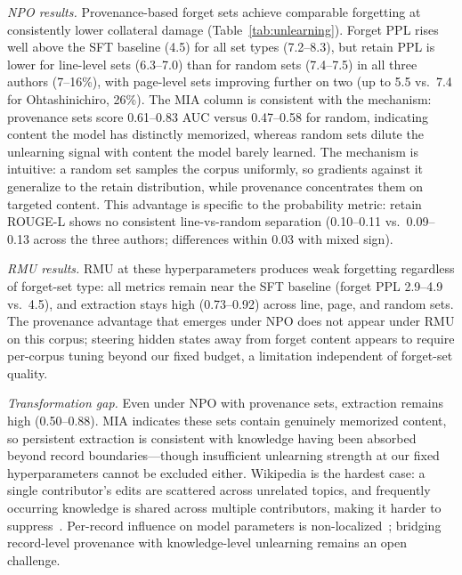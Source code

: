 \emph{NPO results.} Provenance-based forget sets achieve comparable forgetting at consistently lower collateral damage (Table~\ref{tab:unlearning}). Forget PPL rises well above the SFT baseline (4.5) for all set types (7.2--8.3), but retain PPL is lower for line-level sets (6.3--7.0) than for random sets (7.4--7.5) in all three authors (7--16\%), with page-level sets improving further on two (up to 5.5 vs.\ 7.4 for Ohtashinichiro, 26\%). The MIA column is consistent with the mechanism: provenance sets score 0.61--0.83 AUC versus 0.47--0.58 for random, indicating content the model has distinctly memorized, whereas random sets dilute the unlearning signal with content the model barely learned. The mechanism is intuitive: a random set samples the corpus uniformly, so gradients against it generalize to the retain distribution, while provenance concentrates them on targeted content. This advantage is specific to the probability metric: retain ROUGE-L shows no consistent line-vs-random separation (0.10--0.11 vs.\ 0.09--0.13 across the three authors; differences within 0.03 with mixed sign).

\emph{RMU results.} RMU at these hyperparameters produces weak forgetting regardless of forget-set type: all metrics remain near the SFT baseline (forget PPL 2.9--4.9 vs.\ 4.5), and extraction stays high (0.73--0.92) across line, page, and random sets. The provenance advantage that emerges under NPO does not appear under RMU on this corpus; steering hidden states away from forget content appears to require per-corpus tuning beyond our fixed budget, a limitation independent of forget-set quality.

\emph{Transformation gap.} Even under NPO with provenance sets, extraction remains high (0.50--0.88). MIA indicates these sets contain genuinely memorized content, so persistent extraction is consistent with knowledge having been absorbed beyond record boundaries---though insufficient unlearning strength at our fixed hyperparameters cannot be excluded either. Wikipedia is the hardest case: a single contributor's edits are scattered across unrelated topics, and frequently occurring knowledge is shared across multiple contributors, making it harder to suppress~\cite{krishnan2025notall}. Per-record influence on model parameters is non-localized~\cite{hammoudeh2024influence}; bridging record-level provenance with knowledge-level unlearning remains an open challenge.

